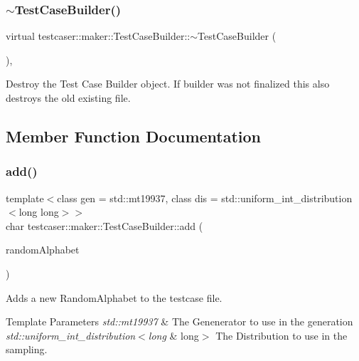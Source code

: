 \subsubsection{\texorpdfstring{$\sim$TestCaseBuilder()}{~TestCaseBuilder()}}
{\footnotesize\ttfamily virtual testcaser\+::maker\+::\+Test\+Case\+Builder\+::$\sim$\+Test\+Case\+Builder (\begin{DoxyParamCaption}{ }\end{DoxyParamCaption})\hspace{0.3cm}{\ttfamily [inline]}, {\ttfamily [virtual]}}



Destroy the Test Case Builder object. If builder was not finalized this also destroys the old existing file. 



\subsection{Member Function Documentation}
\mbox{\label{classtestcaser_1_1maker_1_1TestCaseBuilder_a26c5a045c2b1c4db64f4542aaee326aa}} 
\subsubsection{\texorpdfstring{add()}{add()}\hspace{0.1cm}{\footnotesize\ttfamily [1/11]}}
{\footnotesize\ttfamily template$<$class gen  = std\+::mt19937, class dis  = std\+::uniform\+\_\+int\+\_\+distribution$<$long long$>$$>$ \\
char testcaser\+::maker\+::\+Test\+Case\+Builder\+::add (\begin{DoxyParamCaption}\item[{\mbox{\hyperlink{classtestcaser_1_1maker_1_1types_1_1RandomAlphabet}{types\+::\+Random\+Alphabet}}$<$ gen, dis $>$ \&}]{random\+Alphabet }\end{DoxyParamCaption})\hspace{0.3cm}{\ttfamily [inline]}}



Adds a new Random\+Alphabet to the testcase file. 


\begin{DoxyTemplParams}{Template Parameters}
{\em std\+::mt19937} & The Genenerator to use in the generation \\
\hline
{\em std\+::uniform\+\_\+int\+\_\+distribution$<$long} & long$>$ The Distribution to use in the sampling. \\
\hline
\end{DoxyTemplParams}

